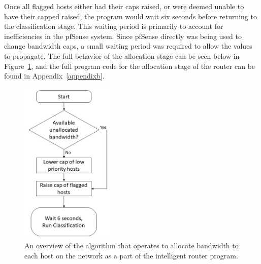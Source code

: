 Once all flagged hosts either had their caps raised, or were deemed unable to have their capped raised, the program would wait six seconds before returning to the classification stage.
This waiting period is primarily to account for inefficiencies in the pfSense system.
Since pfSense directly was being used to change bandwidth caps, a small waiting period was required to allow the values to propagate.
The full behavior of the allocation stage can be seen below in Figure~\ref{allocation}, and the full program code for the allocation stage of the router can be found in Appendix~\ref{appendixb}.
\begin{figure}[!ht]
    \centering
    \includegraphics[width=0.4\textwidth,keepaspectratio]{Images/Chpt4/Flowchart_Allocation_Updated.png}
    \caption{An overview of the algorithm that operates to allocate bandwidth to each host on the network as a part of the intelligent router program.}
    \label{allocation}
\end{figure}

